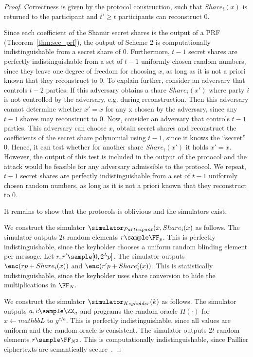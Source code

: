 \begin{proof}
Correctness is given by the protocol construction, such that $Share_{i}(x)$ is returned to the participant and $t' \geq t$ participants can reconstruct $0$.

Since each coefficient of the Shamir secret shares is the output of a PRF (Theorem~\ref{thm:sec_prf}), the output of Scheme 2 is computationally indistinguishable from a secret share of $0$.
Furthermore, $t-1$ secret shares are perfectly indistinguishable from a set of $t-1$ uniformly chosen random numbers, since they leave one degree of freedom for choosing $x$, as long as it is not a priori known that they reconstruct to $0$.
To explain further, consider an adversary that controls $t-2$ parties.
If this adversary obtains a share $Share_{i}(x')$ where party $i$ is not controlled by the adversary, e.g. during reconstruction.
Then this adversary cannot determine whether $x' = x$ for any x chosen by the adversary, since any $t-1$ shares may reconstruct to $0$.
Now, consider an adversary that controls $t-1$ parties.
This adversary can choose $x$, obtain secret shares and reconstruct the coefficients of the secret share polynomial using $t-1$, since it knows the ``secret'' $0$.
Hence, it can test whether for another share $Share_{i}(x')$ it holds $x'= x$.
However, the output of this test is included in the output of the protocol and the attack would be feasible for any adversary admissible to the protocol.
We repeat, $t-1$ secret shares are perfectly indistinguishable from a set of $t-1$ uniformly chosen random numbers, as long as it is not a priori known that they reconstruct to $0$.

It remains to show that the protocols is oblivious and the simulators exist.

We construct the simulator $\simulator_{Participant}(x, Share_{i}(x)$ as follows.
The simulator outputs $2t$ random elements $r \sample \FF_p$.
This is perfectly indistinguishable, since the keyholder chooses a uniform random blinding element per message.
Let $r, r' \sample [0, 2^{\lambda} p]$.
The simulator outputs $\enc(r p + Share_{i}(x))$ and $\enc(r' p + Share'_{i}(x))$.
This is statistically indistinguishable, since the keyholder uses share conversion to hide the multiplications in $\FF_N$.

We construct the simulator $\simulator_{Keyholder}(k)$ as follows.
The simulator outputs $a, c \sample \ZZ_{q}$ and programs the random oracle $H(\cdot)$ for $x \gets mathbb{L}$ to $g^{c/a}$.
This is perfectly indistinguishable, since all values are uniform and the random oracle is consistent.
The simulator outputs $2t$ random elements $r \sample \FF_{N^2}$.
This is computationally indistinguishable, since Paillier ciphertexts are semantically secure~\cite{Paillier}.

\end{proof}
